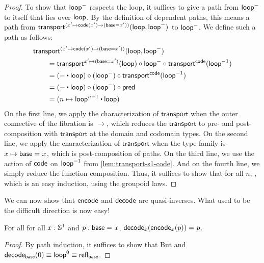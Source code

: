 \begin{proof}
To show that $\mathsf{loop}^-$ respects the loop, it suffices to give a path
from $\mathsf{loop}^-$ to itself that lies over $\mathsf{loop}$. 
By the definition of dependent paths, this means a path from $\mathsf{transport}^{(x' \mapsto \mathsf{code}(x')
\rightarrow (\mathsf{base}=x'))}(\mathsf{loop},\mathsf{loop}^-)$ to $\mathsf{loop}^-$.  We define such a
path as follows:
\begin{align*}
  \MoveEqLeft \transfib {(x' \mapsto \code(x') \rightarrow (\base=x'))} \lloop {\lloop^-}\\
&= \transfibf {x'\mapsto (\base=x')}(\lloop) \circ {\lloop^-} \circ \transfibf \code ({\opp \lloop}) \\
&= (- \ct \lloop) \circ (\lloop^-) \circ \transfibf \code ({\opp \lloop}) \\
&= (- \ct \lloop) \circ (\lloop^-) \circ \Zpred \\
&= (n \mapsto \lloop^{n - 1} \ct \lloop)                 
\end{align*}
On the first line, we apply the characterization of $\mathsf{transport}$
when the outer connective of the fibration is $\rightarrow$, which
reduces the $\mathsf{transport}$ to pre- and post-composition with
$\mathsf{transport}$ at the domain and codomain types.  On the second line,
we apply the characterization of $\mathsf{transport}$ when the type family
is $x\mapsto \mathsf{base} =_{} x$, which is post-composition of paths.  On the third line,
we use the action of $\mathsf{code}$ on $\mathord{{\mathsf{loop}}^{-1}}$ from
\autoref{lem:transport-s1-code}.  And on the fourth line, we simply
reduce the function composition.  Thus, it suffices to show that for all
$n$, , which is an easy
induction, using the groupoid laws.  
\end{proof}

We can now show that $\mathsf{encode}$ and $\mathsf{decode}$ are quasi-inverses.
What used to be the difficult direction is now easy!

\begin{lem} \label{lem:s1-decode-encode}  For all 
for all $x: \mathbb{S} ^1$ and $p : \mathsf{base} =_{} x$, $\mathsf{decode}_x({{\mathsf{encode}_x(p)}}) =_{} p$.  
\end{lem}

\begin{proof}
By path induction, it suffices to show that 
But
and $\mathsf{decode}_{\mathsf{base}}(0) \equiv \mathsf{loop}^ 0 \equiv \mathsf{refl}_{\mathsf{base}}$.  
\end{proof}

